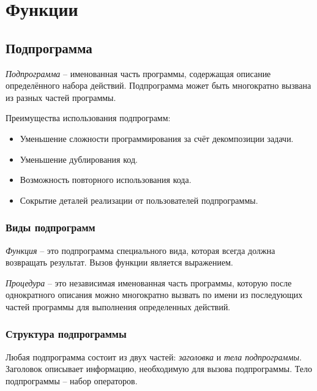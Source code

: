 \section{Функции}

\subsection{Подпрограмма}

\begin{definition}
  \textit{Подпрограмма} -- именованная часть программы, содержащая описание определённого набора действий. Подпрограмма может быть многократно вызвана из разных частей программы.
\end{definition}

Преимущества использования подпрограмм:
\begin{itemize}
  \item Уменьшение сложности программирования за счёт декомпозиции задачи.
  \item Уменьшение дублирования код.
  \item Возможность повторного использования кода.
  \item Сокрытие деталей реализации от пользователей подпрограммы.
\end{itemize}

\subsubsection{Виды подпрограмм}

\begin{definition}
  \textit{Функция} -- это подпрограмма специального вида, которая всегда должна возвращать результат. Вызов функции является выражением.
\end{definition}

\begin{definition}
  \textit{Процедура} -- это независимая именованная часть программы, которую после однократного описания можно многократно вызвать по имени из последующих частей программы для выполнения определенных действий.
\end{definition}

\subsubsection{Структура подпрограммы}

Любая подпрограмма состоит из двух частей: \textit{заголовка} и \textit{тела подпрограммы}.  
Заголовок описывает информацию, необходимую для вызова подпрограммы. Тело подпрограммы -- набор операторов.

